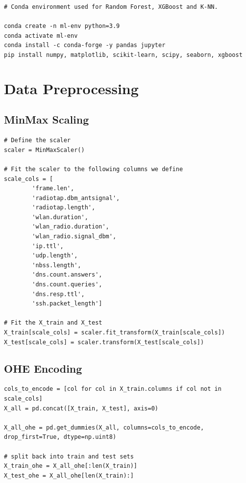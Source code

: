 \begin{appendices}
\begin{lstlisting}
# Conda environment used for Random Forest, XGBoost and K-NN.

conda create -n ml-env python=3.9
conda activate ml-env
conda install -c conda-forge -y pandas jupyter
pip install numpy, matplotlib, scikit-learn, scipy, seaborn, xgboost
\end{lstlisting}

\newpage

\section{Data Preprocessing}
\label{appx:Data Processing}

\subsection{MinMax Scaling}
\label{appx:Scaling}

\begin{lstlisting}
# Define the scaler
scaler = MinMaxScaler()

# Fit the scaler to the following columns we define
scale_cols = [
        'frame.len',
        'radiotap.dbm_antsignal', 
        'radiotap.length', 
        'wlan.duration', 
        'wlan_radio.duration', 
        'wlan_radio.signal_dbm',
        'ip.ttl', 
        'udp.length', 
        'nbss.length',
        'dns.count.answers', 
        'dns.count.queries',
        'dns.resp.ttl',
        'ssh.packet_length']
        
# Fit the X_train and X_test
X_train[scale_cols] = scaler.fit_transform(X_train[scale_cols])
X_test[scale_cols] = scaler.transform(X_test[scale_cols])
\end{lstlisting}

\subsection{OHE Encoding}
\label{appx:OHE Encoding}
\begin{lstlisting}
cols_to_encode = [col for col in X_train.columns if col not in scale_cols]
X_all = pd.concat([X_train, X_test], axis=0)

X_all_ohe = pd.get_dummies(X_all, columns=cols_to_encode, drop_first=True, dtype=np.uint8)

# split back into train and test sets
X_train_ohe = X_all_ohe[:len(X_train)]
X_test_ohe = X_all_ohe[len(X_train):]
\end{lstlisting}


\end{appendices}
